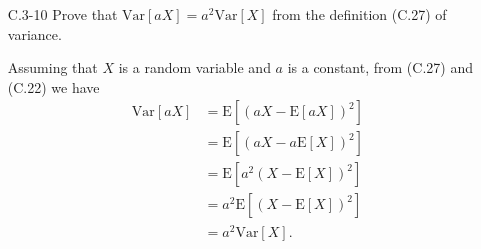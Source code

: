 \begin{enumerate}
\item[C.3{-}10]{Prove that $\text{Var}[aX] = a^2 \text{Var}[X]$ from the
definition (C.27) of variance.}

\begin{framed}
Assuming that $X$ is a random variable and $a$ is a constant, from (C.27) and
(C.22) we have
\begin{equation*}
\begin{aligned}
  \text{Var}[a X] &= \text{E}[(a X - \text{E}[a X])^2]\\
                  &= \text{E}[(a X - a \text{E}[X])^2]\\
                  &= \text{E}[a^2 (X - \text{E}[X])^2]\\
                  &= a^2 \text{E}[(X - \text{E}[X])^2]\\
                  &= a^2 \text{Var}[X].
\end{aligned}
\end{equation*}
\end{framed}

\end{enumerate}
